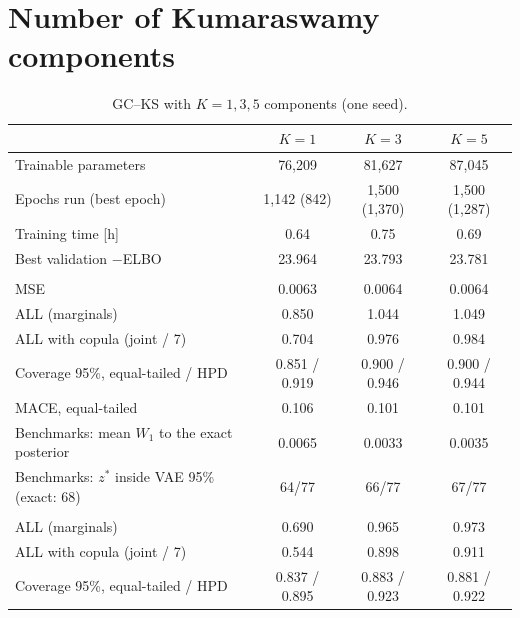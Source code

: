 \documentclass[11pt]{article}
\begin{document}
\section{Number of Kumaraswamy components}\label{sec:K}
\begin{table}[t]
\centering\footnotesize
\caption{GC--KS with $K=1,3,5$ components (one seed).}
\label{tab:K}
\begin{tabular}{l ccc}
\toprule
 & $K=1$ & $K=3$ & $K=5$ \\
\midrule
Trainable parameters                          & 76,209       & 81,627        & 87,045 \\
Epochs run (best epoch)                       & 1,142 (842)  & 1,500 (1,370) & 1,500 (1,287) \\
Training time [h]                             & 0.64         & 0.75          & 0.69 \\
Best validation $-$ELBO                       & 23.964       & 23.793        & 23.781 \\
\addlinespace
\multicolumn{4}{l}{\emph{Test set A}} \\
MSE                                           & 0.0063       & 0.0064        & 0.0064 \\
ALL (marginals)                               & 0.850        & 1.044         & 1.049 \\
ALL with copula (joint / 7)                   & 0.704        & 0.976         & 0.984 \\
Coverage 95\%, equal-tailed / HPD             & 0.851 / 0.919 & 0.900 / 0.946 & 0.900 / 0.944 \\
MACE, equal-tailed                            & 0.106        & 0.101         & 0.101 \\
Benchmarks: mean $W_1$ to the exact posterior & 0.0065       & 0.0033        & 0.0035 \\
Benchmarks: $z^*$ inside VAE 95\% (exact: 68) & 64/77        & 66/77         & 67/77 \\
\addlinespace
\multicolumn{4}{l}{\emph{Test set B}} \\
ALL (marginals)                               & 0.690        & 0.965         & 0.973 \\
ALL with copula (joint / 7)                   & 0.544        & 0.898         & 0.911 \\
Coverage 95\%, equal-tailed / HPD             & 0.837 / 0.895 & 0.883 / 0.923 & 0.881 / 0.922 \\
\bottomrule
\end{tabular}
\end{table}
\end{document}
